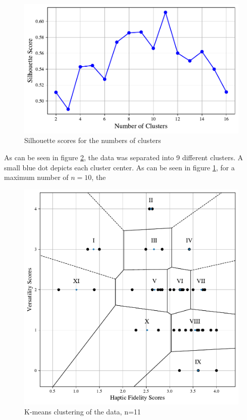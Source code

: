 \begin{figure}[htbp]
    \centering
    \includegraphics[width=\columnwidth]{figures/silhouette_11.pdf} 
    \caption{Silhouette scores for the numbers of clusters}
    \label{fig:silhouette}
\end{figure}

As can be seen in figure \ref{fig:kmeans}, the data was separated into 9 different clusters. A small blue dot depicts each cluster center. As can be seen in figure \ref{fig:silhouette}, for a maximum number of $n=10$, the 

\begin{figure}[htbp]
    \centering
    \includegraphics[width=\columnwidth]{figures/k_means_11.pdf} 
    \caption{K-means clustering of the data, n=11}
    \label{fig:kmeans}
\end{figure}


